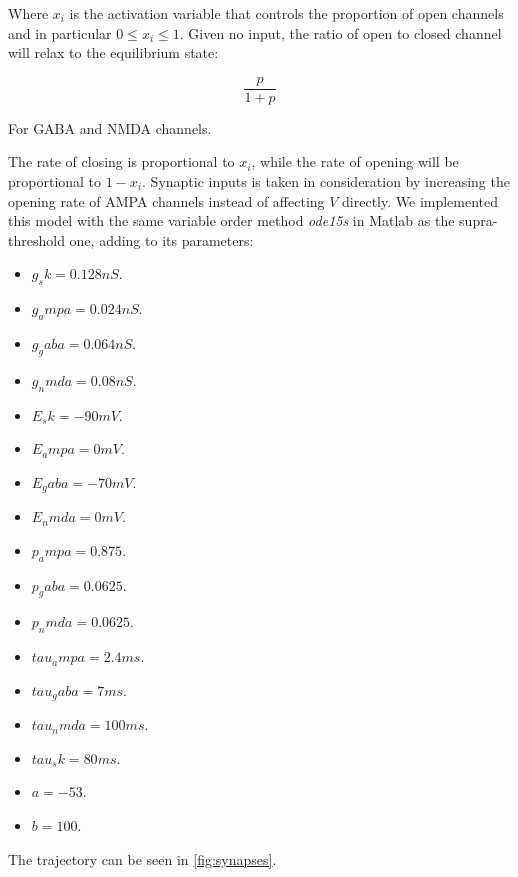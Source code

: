		Where $x_i$ is the activation variable that controls the proportion of open channels and in particular $0\le x_i\le 1$.
		Given no input, the ratio of open to closed channel will relax to the equilibrium state:

		$$\frac{p}{1+p}$$

		For GABA and NMDA channels.

		The rate of closing is proportional to $x_i$, while the rate of opening will be proportional to $1-x_i$.
		Synaptic inputs is taken in consideration by increasing the opening rate of AMPA channels instead of affecting $V$ directly.
		We implemented this model with the same variable order method \emph{ode15s} \cite{ode15s} in Matlab as the supra-threshold one, adding to its parameters:

		\begin{multicols}{2}
			\begin{itemize}
				\item $g_sk = 0.128 nS$.
				\item $g_ampa = 0.024 nS$.
				\item $g_gaba = 0.064 nS$.
				\item $g_nmda = 0.08 nS$.
				\item $E_sk = -90 mV$.
				\item $E_ampa = 0 mV$.
				\item $E_gaba = -70 mV$.
				\item $E_nmda = 0 mV$.
				\item $p_ampa = 0.875$.
				\item $p_gaba = 0.0625$.
				\item $p_nmda = 0.0625$.
				\item $tau_ampa = 2.4 ms$.
				\item $tau_gaba = 7 ms$.
				\item $tau_nmda = 100 ms$.
				\item $tau_sk = 80 ms$.
				\item $a = -53$.
				\item $b = 100$.
			\end{itemize}
		\end{multicols}

		The trajectory can be seen in \ref{fig:synapses}.

